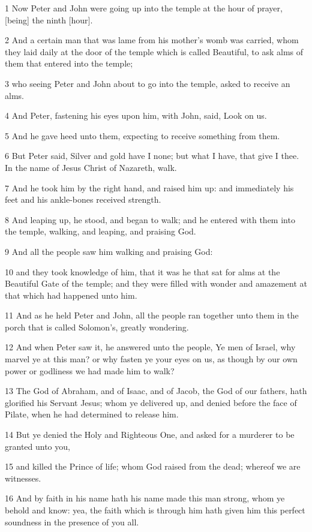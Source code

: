 \par 1 Now Peter and John were going up into the temple at the hour of prayer, [being] the ninth [hour].
\par 2 And a certain man that was lame from his mother's womb was carried, whom they laid daily at the door of the temple which is called Beautiful, to ask alms of them that entered into the temple;
\par 3 who seeing Peter and John about to go into the temple, asked to receive an alms.
\par 4 And Peter, fastening his eyes upon him, with John, said, Look on us.
\par 5 And he gave heed unto them, expecting to receive something from them.
\par 6 But Peter said, Silver and gold have I none; but what I have, that give I thee. In the name of Jesus Christ of Nazareth, walk.
\par 7 And he took him by the right hand, and raised him up: and immediately his feet and his ankle-bones received strength.
\par 8 And leaping up, he stood, and began to walk; and he entered with them into the temple, walking, and leaping, and praising God.
\par 9 And all the people saw him walking and praising God:
\par 10 and they took knowledge of him, that it was he that sat for alms at the Beautiful Gate of the temple; and they were filled with wonder and amazement at that which had happened unto him.
\par 11 And as he held Peter and John, all the people ran together unto them in the porch that is called Solomon's, greatly wondering.
\par 12 And when Peter saw it, he answered unto the people, Ye men of Israel, why marvel ye at this man? or why fasten ye your eyes on us, as though by our own power or godliness we had made him to walk?
\par 13 The God of Abraham, and of Isaac, and of Jacob, the God of our fathers, hath glorified his Servant Jesus; whom ye delivered up, and denied before the face of Pilate, when he had determined to release him.
\par 14 But ye denied the Holy and Righteous One, and asked for a murderer to be granted unto you,
\par 15 and killed the Prince of life; whom God raised from the dead; whereof we are witnesses.
\par 16 And by faith in his name hath his name made this man strong, whom ye behold and know: yea, the faith which is through him hath given him this perfect soundness in the presence of you all.
